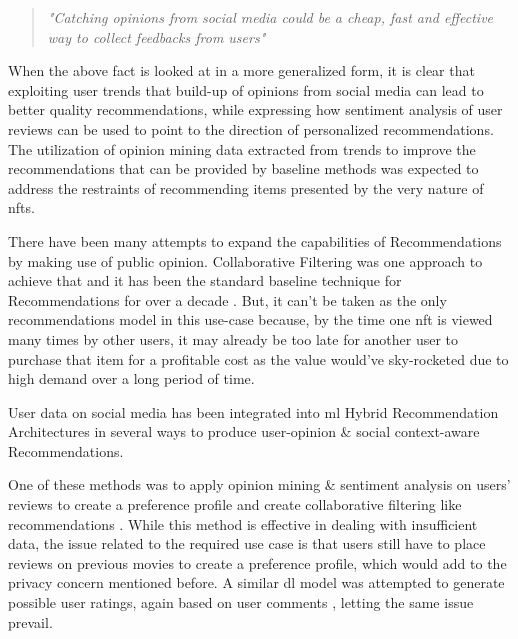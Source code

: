\documentclass[manuscript,natbib=false]{acmart}
\begin{document}
\begin{quote} 
\centering 
\emph{"Catching opinions from social media could be a cheap, fast and effective way to collect feedbacks from users"} 
\\
\raggedleft
\cite{zhangOpinionMiningSentiment2018}
\end{quote}

When the above fact is looked at in a more generalized form, it is clear that exploiting user trends that build-up of opinions from social media can lead to better quality recommendations, while \cite{huReviewerCredibilitySentiment2020} expressing how sentiment analysis of user reviews can be used to point to the direction of personalized recommendations.\\


The utilization of opinion mining data extracted from trends to improve the recommendations that can be provided by baseline methods was expected to address the restraints of recommending items presented by the very nature of \gls{nft}s.


There have been many attempts to expand the capabilities of Recommendations by making use of public opinion. Collaborative Filtering was one approach to achieve that and it has been the standard baseline technique for Recommendations for over a decade \cite{lindenAmazonComRecommendations2003, smithTwoDecadesRecommender2017}. But, it can't be taken as the only recommendations model in this use-case because, by the time one \gls{nft} is viewed many times by other users, it may already be too late for another user to purchase that item for a profitable cost as the value would've sky-rocketed due to high demand over a long period of time.

User data on social media has been integrated into \gls{ml} Hybrid Recommendation Architectures in several ways to produce user-opinion \& social context-aware Recommendations. 

One of these methods was to apply opinion mining \& sentiment analysis on users' reviews to create a preference profile and create collaborative filtering like recommendations \cite{chengHybridRecommenderSystem2020a}. While this method is effective in dealing with insufficient data, the issue related to the required use case is that users still have to place reviews on previous movies to create a preference profile, which would add to the privacy concern mentioned before. A similar \gls{dl} model was attempted to generate possible user ratings, again based on user comments \cite{chenUserRatingClassification2019}, letting the same issue prevail.
\end{document}
